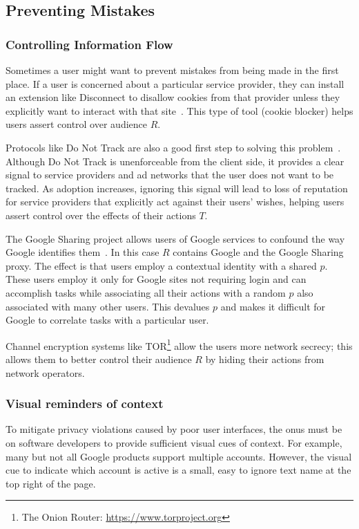 \documentclass{llncs}
\begin{document}
\begin{comment}
\cite{viegas}blogger's expectation of privacy
\end{comment}

\subsection{Preventing Mistakes}
\subsubsection{Controlling Information Flow}
Sometimes a user might want to prevent mistakes from being made in the first
place. If a user is concerned about a particular service provider, they can
install an extension like Disconnect to disallow cookies from that provider
unless they explicitly want to interact with that site~\cite{disconnect}.
This type of tool (cookie blocker) helps users assert control over audience $R$.

Protocols like Do Not Track are also a good first step to solving this
problem~\cite{dnt}. Although Do Not Track is unenforceable from the client
side, it provides a clear signal to service providers and ad networks
that the user does not want to be tracked. As adoption increases, ignoring this
signal will lead to loss of reputation for service providers that explicitly
act against their users' wishes, helping
users assert control over the effects of their actions $T$.

The Google Sharing project allows users of Google services to confound the way
Google identifies them~\cite{googlesharing}. In this case $R$ contains Google
and the Google Sharing proxy. The effect is that users employ a contextual
identity with a shared $p$. These users employ it only for Google sites not
requiring login and can accomplish tasks while associating all their actions
with a random $p$ also associated with many other users.  This devalues $p$ and
makes it difficult for Google to correlate tasks with a particular user.

Channel encryption systems like TOR\footnote{The Onion Router: \url{https://www.torproject.org}} allow the users more network secrecy; this allows them to better control their audience $R$ by hiding their actions from network operators.

\subsubsection{Visual reminders of context}
To mitigate privacy violations caused by poor user interfaces, the onus must be
on software developers to provide sufficient visual cues of context. For
example, many but not all Google products support multiple accounts. However,
the visual cue to indicate which account is active is a small, easy to ignore
text name at the top right of the page.
\end{document}
